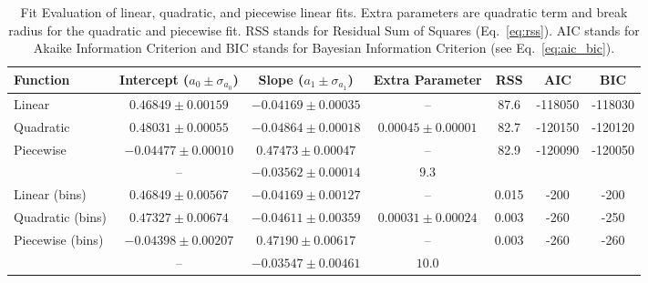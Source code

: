 
\begin{table*}
\caption{
Fit Evaluation of linear, quadratic, and piecewise linear fits.
Extra parameters are quadratic term and break radius for the quadratic and piecewise fit.
RSS stands for Residual Sum of Squares (Eq.~\ref{eq:rss}).
AIC stands for Akaike Information Criterion and BIC stands for Bayesian Information Criterion (see Eq.~\ref{eq:aic_bic}).
}
\label{tab:global_fit_results_comparison}
\begin{tabularx}{\columnwidth}{lCCCCCC}
\hline
Function & Intercept ($a_0 \pm \sigma_{a_0}$) & Slope ($a_1 \pm \sigma_{a_1}$) & Extra Parameter & RSS & AIC & BIC \\
\hline
Linear & $0.46849 \pm 0.00159$  & $-0.04169 \pm 0.00035$ & -- & 87.6 & -118050  & -118030 \\ 
Quadratic & $0.48031 \pm 0.00055$  & $-0.04864 \pm 0.00018$ & $0.00045 \pm 0.00001$ & 82.7 & -120150  & -120120 \\ 
Piecewise & $-0.04477 \pm 0.00010$ & $0.47473 \pm 0.00047$ & -- & 82.9 & -120090  & -120050 \\ 
 & -- & $-0.03562 \pm 0.00014$ & $9.3$ & & & \\ 
\hline
Linear (bins)& $0.46849 \pm 0.00567$  & $-0.04169 \pm 0.00127$ & -- & 0.015 & -200  & -200 \\ 
Quadratic (bins) & $0.47327 \pm 0.00674$  & $-0.04611 \pm 0.00359$ & $0.00031 \pm 0.00024$ & 0.003 & -260  & -250 \\ 
Piecewise (bins) & $-0.04398 \pm 0.00207$ & $0.47190 \pm 0.00617$ & -- & 0.003 & -260  & -260 \\ 
 & -- & $-0.03547 \pm 0.00461$ & $10.0$ & & & \\ 
\hline
\end{tabularx}
\end{table*}
